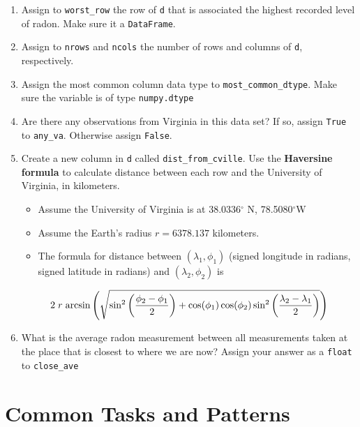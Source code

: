\documentclass[
  12pt,
  krantz2]{krantz}
\providecommand{\tightlist}{%
  \setlength{\itemsep}{0pt}\setlength{\parskip}{0pt}}
\begin{document}
\begin{enumerate}
\def\labelenumi{\alph{enumi})}
\tightlist
\item
  Assign to \texttt{worst\_row} the row of \texttt{d} that is associated the highest recorded level of radon. Make sure it a \texttt{DataFrame}.
\item
  Assign to \texttt{nrows} and \texttt{ncols} the number of rows and columns of \texttt{d}, respectively.
\item
  Assign the most common column data type to \texttt{most\_common\_dtype}. Make sure the variable is of type \texttt{numpy.dtype}
\item
  Are there any observations from Virginia in this data set? If so, assign \texttt{True} to \texttt{any\_va}. Otherwise assign \texttt{False}.
\item
  Create a new column in \texttt{d} called \texttt{dist\_from\_cville}. Use the \textbf{Haversine formula} to calculate distance between each row and the University of Virginia, in kilometers.

  \begin{itemize}
  \tightlist
  \item
    Assume the University of Virginia is at 38.0336\(^\circ\) N, 78.5080\(^\circ\)W
  \item
    Assume the Earth's radius \(r = 6378.137\) kilometers.
  \item
    The formula for distance between \((\lambda_1, \phi_1)\) (signed longitude in radians, signed latitude in radians) and \((\lambda_2, \phi_2)\) is
  \end{itemize}

  \begin{equation}
   2 \hspace{1mm} r \hspace{1mm} \text{arcsin}\left( \sqrt{ \sin^2\left( \frac{\phi_2 - \phi_1}{2}\right)  + \cos(\phi_1)\cos(\phi_2) \sin^2\left( \frac{\lambda_2 - \lambda_1}{2} \right)  } \right)
   \end{equation}
\item
  What is the average radon measurement between all measurements taken at the place that is closest to where we are now? Assign your answer as a \texttt{float} to \texttt{close\_ave}
\end{enumerate}

\hypertarget{part-common-tasks-and-patterns}{%
\part{Common Tasks and Patterns}\label{part-common-tasks-and-patterns}}
\end{document}
